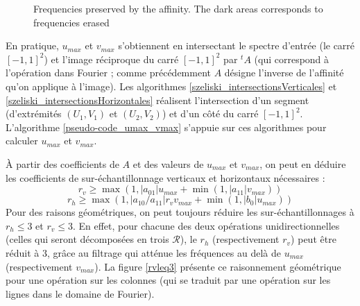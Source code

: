 \begin{figure}
		\caption{Frequencies preserved by the affinity. The dark areas corresponds to frequencies erased}
		\label{uMax_vMax}
		\end{figure}
		
		En pratique, $u_{max}$ et $v_{max}$ s'obtiennent en intersectant le spectre d'entrée (le carré $[-1,1]^2$) et l'image réciproque du carré $[-1,1]^2$ par $^t\!A$ (qui correspond à l'opération dans Fourier ; comme précédemment $A$ désigne l'inverse de l'affinité qu'on applique à l'image). Les algorithmes \ref{szeliski_intersectionsVerticales} et \ref{szeliski_intersectionsHorizontales} réalisent l'intersection d'un segment (d'extrémités $(U_1,V_1)$ et $(U_2,V_2)$) et d'un côté du carré $[-1,1]^2$. L'algorithme \ref{pseudo-code_umax_vmax} s'appuie sur ces algorithmes pour calculer $u_{max}$ et $v_{max}$.
		
		À partir des coefficients de $A$ et des valeurs de $u_{max}$ et $v_{max}$, on peut en déduire les coefficients de sur-échantillonnage verticaux et horizontaux nécessaires \cite{szeliski2010high} :
		\[r_v \geq \max (1,|a_{01}|u_{max}+\min (1,|a_{11}|v_{max}))\]
		\[r_h \geq \max (1,|a_{10}/a_{11}|r_vv_{max}+\min (1,|b_0|u_{max}))\]
		Pour des raisons géométriques, on peut toujours réduire les sur-échantillonnages à $r_h \leq 3$ et $r_v \leq 3$. En effet, pour chacune des deux opérations unidirectionnelles (celles qui seront décomposées en trois $\mathcal R$), le $r_h$ (respectivement $r_v$) peut être réduit à 3, grâce au filtrage qui atténue les fréquences au delà de $u_{max}$ (respectivement $v_{max}$). La figure \ref{rvleq3} présente ce raisonnement géométrique pour une opération sur les colonnes (qui se traduit par une opération sur les lignes dans le domaine de Fourier).
		
